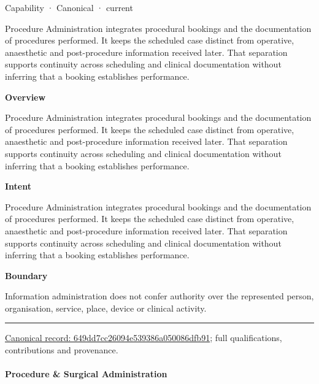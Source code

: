 \label{element:649dd7cc26094e539386a050086dfb91}
{\small Capability · Canonical · current}\par

Procedure Administration integrates procedural bookings and the documentation of procedures performed. It keeps the scheduled case distinct from operative, anaesthetic and post-procedure information received later. That separation supports continuity across scheduling and clinical documentation without inferring that a booking establishes performance.



\textbf{Overview}



Procedure Administration integrates procedural bookings and the documentation of procedures performed. It keeps the scheduled case distinct from operative, anaesthetic and post-procedure information received later. That separation supports continuity across scheduling and clinical documentation without inferring that a booking establishes performance.



\textbf{Intent}



Procedure Administration integrates procedural bookings and the documentation of procedures performed. It keeps the scheduled case distinct from operative, anaesthetic and post-procedure information received later. That separation supports continuity across scheduling and clinical documentation without inferring that a booking establishes performance.



\textbf{Boundary}



Information administration does not confer authority over the represented person, organisation, service, place, device or clinical activity.



\medskip\hrule\medskip

{\footnotesize \href{../../../../continuum/strategy/capability/649dd7cc26094e539386a050086dfb91.md}{Canonical record: 649dd7cc26094e539386a050086dfb91}; full qualifications, contributions and provenance.}\par
\paragraph{Procedure \& Surgical Administration}

